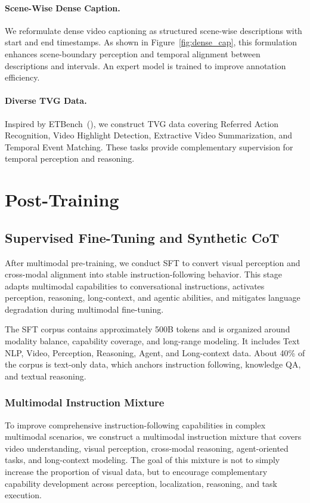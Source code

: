 \documentclass{llmxive}
\begin{document}
\paragraph{Scene-Wise Dense Caption.}
We reformulate dense video captioning as structured scene-wise descriptions with start and end timestamps. As shown in Figure~\ref{fig:dense_cap}, this formulation enhances scene-boundary perception and temporal alignment between descriptions and intervals. An expert model is trained to improve annotation efficiency.

\paragraph{Diverse TVG Data.}
Inspired by ETBench~(\cite{etbench}), we construct TVG data covering Referred Action Recognition, Video Highlight Detection, Extractive Video Summarization, and Temporal Event Matching. These tasks provide complementary supervision for temporal perception and reasoning.

\section{Post-Training}

\subsection{Supervised Fine-Tuning and Synthetic CoT}

After multimodal pre-training, we conduct SFT to convert visual perception and cross-modal alignment into stable instruction-following behavior. This stage adapts multimodal capabilities to conversational instructions, activates perception, reasoning, long-context, and agentic abilities, and mitigates language degradation during multimodal fine-tuning.

The SFT corpus contains approximately 500B tokens and is organized around modality balance, capability coverage, and long-range modeling. It includes Text NLP, Video, Perception, Reasoning, Agent, and Long-context data. About 40\% of the corpus is text-only data, which anchors instruction following, knowledge QA, and textual reasoning.

\subsubsection{Multimodal Instruction Mixture}

To improve comprehensive instruction-following capabilities in complex multimodal scenarios, we construct a multimodal instruction mixture that covers video understanding, visual perception, cross-modal reasoning, agent-oriented tasks, and long-context modeling. The goal of this mixture is not to simply increase the proportion of visual data, but to encourage complementary capability development across perception, localization, reasoning, and task execution.
\end{document}
